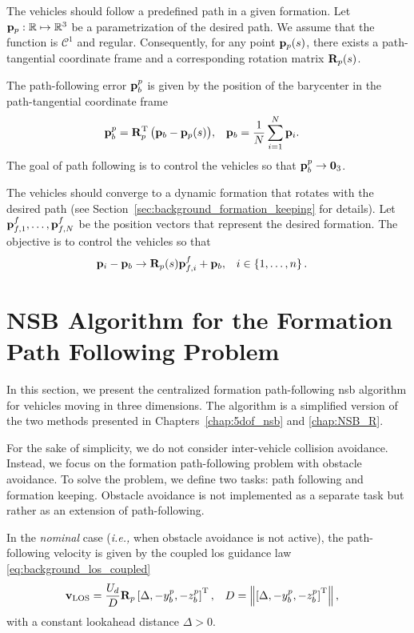 The vehicles should follow a predefined path in a given formation.
Let $\mathbf{p}_p: \mathbb{R} \mapsto \mathbb{R}^3$ be a parametrization of the desired path.
We assume that the function is $\mathcal{C}^1$ and regular.
Consequently, for any point $\mathbf{p}_p(s)$, there exists a path-tangential coordinate frame and a corresponding rotation matrix $\mathbf{R}_p(s)$.

The path-following error $\mathbf{p}_b^p$ is given by the position of the barycenter in the path-tangential coordinate frame 
\begin{align}
    \mathbf{p}_b^p &= \mathbf{R}_p^{\mathrm{T}} \, \big(\mathbf{p}_b - \mathbf{p}_p(s)\big), &
    \mathbf{p}_b &= \frac{1}{N} \sum_{i=1}^N \mathbf{p}_i.
    \label{eq:distr_NSB_barycenter}
\end{align}
The goal of path following is to control the vehicles so that $\mathbf{p}_b^p \rightarrow \mathbf{0}_3$.

The vehicles should converge to a dynamic formation that rotates with the desired path (see Section~\ref{sec:background_formation_keeping} for details).
Let $\mathbf{p}_{f,1}^f, \ldots, \mathbf{p}_{f,N}^f$ be the position vectors that represent the desired formation.
The objective is to control the vehicles so that
\begin{align}
    \mathbf{p}_i - \mathbf{p}_b &\rightarrow \mathbf{R}_p(s) \mathbf{p}_{f,i}^f + \mathbf{p}_b, &
    i &\in \left\{1, \ldots, n \right\}.
\end{align}

\section{NSB Algorithm for the Formation Path Following Problem}
\label{sec:distr_NSB_NSB}
In this section, we present the centralized formation path-following \gls{nsb} algorithm for vehicles moving in three dimensions.
The algorithm is a simplified version of the two methods presented in Chapters~\ref{chap:5dof_nsb} and \ref{chap:NSB_R}.

For the sake of simplicity, we do not consider inter-vehicle collision avoidance.
Instead, we focus on the formation path-following problem with obstacle avoidance.
To solve the problem, we define two tasks: path following and formation keeping.
Obstacle avoidance is not implemented as a separate task but rather as an extension of path-following.

In the \emph{nominal} case (\emph{i.e.,} when obstacle avoidance is not active), the path-following velocity is given by the coupled \acrfull{los} guidance law \eqref{eq:background_los_coupled}
\begin{align}
    \mathbf{v}_{\rm LOS} &= \frac{U_d}{D} \mathbf{R}_p \left[\Delta, -y_b^p, -z_b^p\right]^{\mathrm{T}}, &
    D &= \left\|\left[\Delta, -y_b^p, -z_b^p\right]^{\mathrm{T}}\right\|,
    \label{eq:distr_NSB_v_LOS_centralized}
\end{align}
with a constant lookahead distance $\Delta > 0$.

